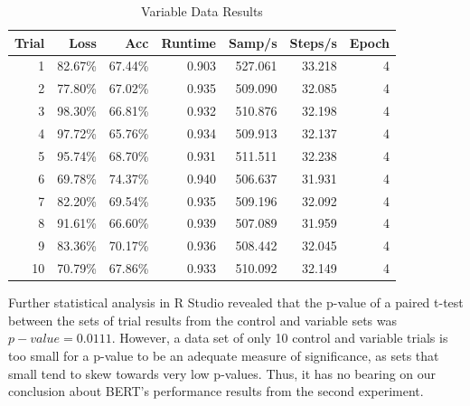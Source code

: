 \documentclass[12pt,letterpaper]{article}
\begin{document}
\begin{table}[!htbp]
    \centering
    \begin{tabular}{|r|r|r|r|r|r|r|}
    \hline
        Trial & Loss & Acc & Runtime & Samp/s & Steps/s & Epoch \\ \hline
        1 & 82.67\% & 67.44\% & 0.903 & 527.061 & 33.218 & 4 \\ \hline
        2 & 77.80\% & 67.02\% & 0.935 & 509.090 & 32.085 & 4 \\ \hline
        3 & 98.30\% & 66.81\% & 0.932 & 510.876 & 32.198 & 4 \\ \hline
        4 & 97.72\% & 65.76\% & 0.934 & 509.913 & 32.137 & 4 \\ \hline
        5 & 95.74\% & 68.70\% & 0.931 & 511.511 & 32.238 & 4 \\ \hline
        6 & 69.78\% & 74.37\% & 0.940 & 506.637 & 31.931 & 4 \\ \hline
        7 & 82.20\% & 69.54\% & 0.935 & 509.196 & 32.092 & 4 \\ \hline
        8 & 91.61\% & 66.60\% & 0.939 & 507.089 & 31.959 & 4 \\ \hline
        9 & 83.36\% & 70.17\% & 0.936 & 508.442 & 32.045 & 4 \\ \hline
        10 & 70.79\% & 67.86\% & 0.933 & 510.092 & 32.149 & 4 \\ \hline
    \end{tabular}
    \caption{Variable Data Results}
    \label{t:variable_results}
\end{table}

Further statistical analysis in R Studio revealed that the p-value of a paired t-test between the sets of trial results from the control and variable sets was $p-value = 0.0111$. However, a data set of only 10 control and variable trials is too small for a p-value to be an adequate measure of significance, as sets that small tend to skew towards very low p-values. Thus, it has no bearing on our conclusion about BERT's performance results from the second experiment.
\end{document}
